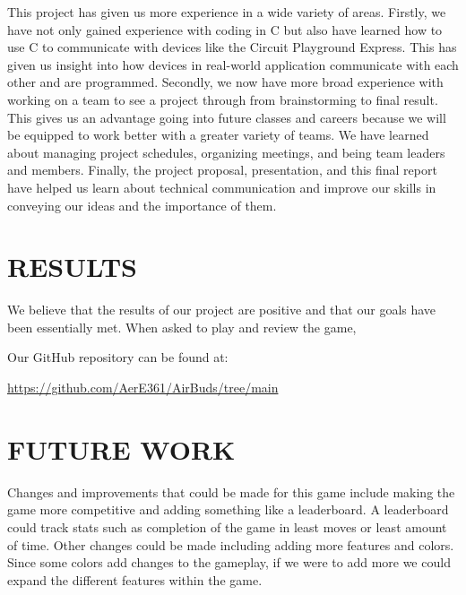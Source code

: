 \documentclass[12pt]{article}
\begin{document}
This project has given us more experience in a wide variety of areas. Firstly, we have not only gained experience with coding in C but also have learned how to use C to communicate with devices like the Circuit Playground Express. This has given us insight into how devices in real-world application communicate with each other and are programmed. Secondly, we now have more broad experience with working on a team to see a project through from brainstorming to final result. This gives us an advantage going into future classes and careers because we will be equipped to work better with a greater variety of teams. We have learned about managing project schedules, organizing meetings, and being team leaders and members. Finally, the project proposal, presentation, and this final report have helped us learn about technical communication and improve our skills in conveying our ideas and the importance of them.

\section{RESULTS}

We believe that the results of our project are positive and that our goals have been essentially met. When asked to play and review the game, 

Our GitHub repository can be found at:

\url{https://github.com/AerE361/AirBuds/tree/main}


\section{FUTURE WORK}
Changes and improvements that could be made for this game include making the game more competitive and adding something like a leaderboard. A leaderboard could track stats such as completion of the game in least moves or least amount of time. Other changes could be made including adding more features and colors. Since some colors add changes to the gameplay, if we were to add more we could expand the different features within the game. 
\end{document}

